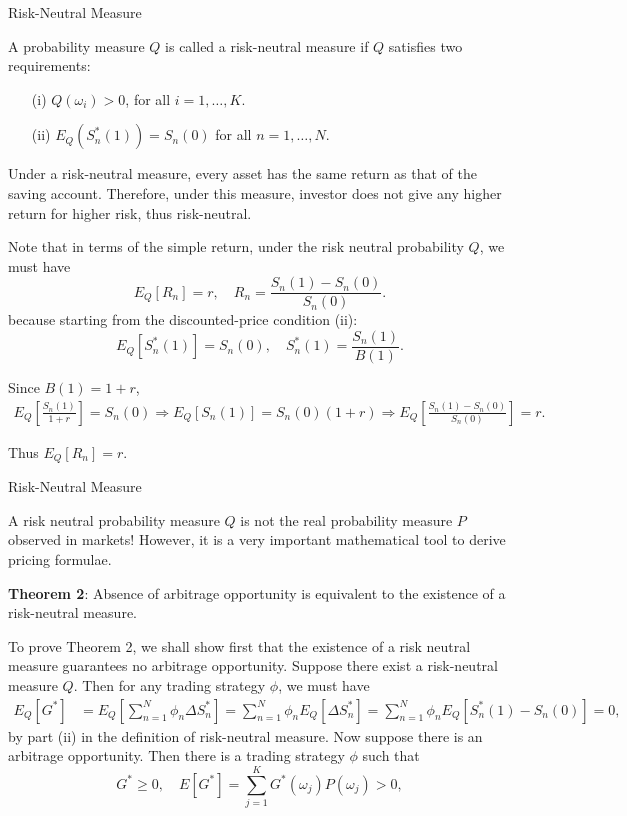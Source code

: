 \documentclass{beamer}
\begin{document}
\begin{frame}{Risk-Neutral Measure}

    {\footnotesize \footnotesize
        A probability measure $Q$ is called a risk-neutral measure if $Q$ satisfies two requirements:
\begin{enumerate}
\item[(i)] $Q(\omega_i) > 0$, for all $i = 1, \ldots, K$.
\item[(ii)] $E_Q(S_n^*(1)) = S_n(0)$ for all $n = 1, \ldots, N$.
\end{enumerate}

Under a risk-neutral measure, every asset has the same return as that 
of the saving account. Therefore, under this measure, 
investor does not give any higher return for higher risk, thus risk-neutral.
\vspace{1em}
\par Note that in terms of the simple return, under the risk neutral probability $Q$, we must have
\[
E_Q[R_n] = r, \quad R_n = \frac{S_n(1) - S_n(0)}{S_n(0)}.
\]
because starting from the discounted-price condition (ii):  
\[
E_Q[S_n^*(1)] = S_n(0), \quad S_n^*(1) = \frac{S_n(1)}{B(1)}.
\]

Since $B(1) = 1 + r$,  
\begin{align*}
E_Q\left[\frac{S_n(1)}{1 + r}\right] = S_n(0) 
\Rightarrow E_Q[S_n(1)] = S_n(0)(1 + r) 
\Rightarrow E_Q\left[\frac{S_n(1) - S_n(0)}{S_n(0)}\right] = r.
\end{align*}

Thus $E_Q[R_n] = r$.

    }
\end{frame}

\begin{frame}{Risk-Neutral Measure}

    {\footnotesize \footnotesize
    \par A risk neutral probability measure $Q$ is not the real probability 
    measure $P$ observed in markets! 
    However, it is a very important mathematical tool to derive pricing formulae. 
    \vspace{1em}
    \par \textbf{Theorem 2}: Absence of arbitrage opportunity is equivalent 
    to the existence of a risk-neutral measure.
    \par To prove Theorem 2, we shall show first that the existence of a risk neutral measure guarantees no arbitrage opportunity. Suppose there exist a risk-neutral measure $Q$. Then for any trading strategy $\phi$, we must have
\begin{align*}
E_Q[G^*] &= E_Q\left[\sum_{n=1}^N \phi_n \Delta S_n^*\right] = \sum_{n=1}^N \phi_n E_Q[\Delta S_n^*] 
= \sum_{n=1}^N \phi_n E_Q[S_n^*(1) - S_n(0)] = 0,
\end{align*}
by part (ii) in the definition of risk-neutral measure. Now suppose there is an arbitrage opportunity. Then there is a trading strategy $\phi$ such that
\[
G^* \geq 0, \quad E[G^*] = \sum_{j=1}^K G^*(\omega_j) P(\omega_j) > 0,
\]
    }
\end{frame}
\end{document}
